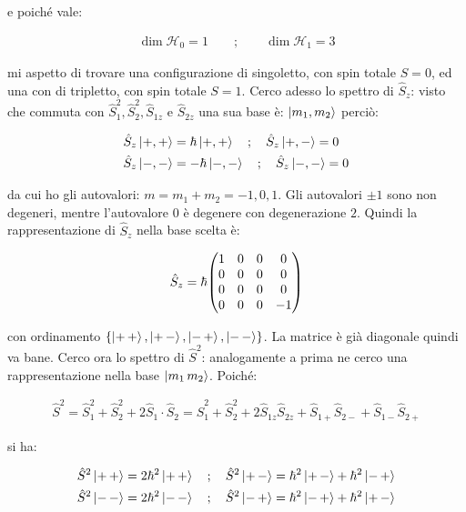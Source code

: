 	e poiché vale:
	
\begin{align*}
	\dim \mathcal{H}_0 = 1 \qquad ; \qquad \dim \mathcal{H}_1 = 3
\end{align*}

	mi aspetto di trovare una configurazione di singoletto, con spin totale $S = 0$, ed una con di tripletto, con spin totale $S = 1$. Cerco adesso lo spettro di $\hat{S}_z$: visto che commuta con $\hat{S}_1^2, \hat{S}_2^2, \hat{S}_{1z} $ e $\hat{S}_{2z}$ una sua base è: $\ket{m_1, m_2}$ perciò:
	
\begin{align*}
	& \hat{S}_z \ket{+, +} = \hbar \ket{+, +} \quad ; \quad \hat{S}_z \ket{+, -} = 0 \\
	& \hat{S}_z \ket{-, -} =  - \hbar \ket{-, -} \quad ; \quad \hat{S}_z \ket{-, -} = 0
\end{align*}

	da cui ho gli autovalori: $ m = m_1 + m_2 = -1, 0, 1$. Gli autovalori $\pm 1$ sono non degeneri, mentre l'autovalore $0$ è degenere con degenerazione $2$. Quindi la rappresentazione di $\hat{S}_z$ nella base scelta è:
	
\begin{align*}
	\hat{S}_z = \hbar \mqty( 1 & 0 & 0 & 0 \\ 0 & 0 & 0 & 0 \\ 0 & 0 & 0 & 0 \\ 0 & 0 & 0 & -1)
\end{align*}

	con ordinamento $\qty{\ket{+ \, +},  \ket{+ \, -}, \ket{- \, +}, \ket{-\, -}}$. La matrice è già diagonale quindi va bane. Cerco ora lo spettro di $\hat{S}^2$: analogamente a prima ne cerco una rappresentazione nella base $\ket{m_1 \, m_2}$. Poiché:
 
\begin{align*}
	\hat{S}^2 = \hat{S}_1^2 + \hat{S}_2^2 + 2 \hat{S}_1 \cdot \hat{S}_2 = \hat{S}_1^2 + \hat{S}_2^2 + 2 \hat{S}_{1z}\hat{S}_{2z} + \hat{S}_{1+} \hat{S}_{2-} + \hat{S}_{1-} \hat{S}_{2+}
\end{align*}

	si ha:
	
\begin{align*}
	& \hat{S}^2 \ket{ + \, + } = 2\hbar^2 \ket{+ \, +} \quad ; \quad \hat{S}^2 \ket{ + \, - } = \hbar^2 \ket{+ \, -} + \hbar^2 \ket{- \, +} \\
	& \hat{S}^2 \ket{ - \, - } = 2\hbar^2 \ket{- \, -} \quad ; \quad \hat{S}^2 \ket{ - \, + } = \hbar^2 \ket{- \, +} + \hbar^2 \ket{+ \, -}
\end{align*}

